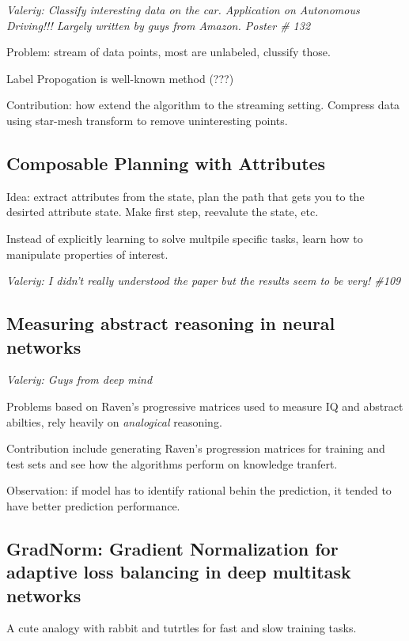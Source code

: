 \documentclass[11pt,oneside,a4paper]{scrartcl}
\newcommand{\valeriy}[1]{{\color{blue}\textit{Valeriy: #1}}}
\begin{document}
\valeriy{Classify interesting data on the car. Application on
  Autonomous Driving!!! Largely written by guys from Amazon. Poster \#
  132}

Problem: stream of data points, most are unlabeled, clussify those.

Label Propogation is well-known method (???)

Contribution: how extend the algorithm to the streaming
setting. Compress data using star-mesh transform to remove
uninteresting points.  

\subsection{Composable Planning with Attributes \cite{zhang18k}}
\label{sec:comp-plann-with}

Idea: extract attributes from the state, plan the path that gets you
to the desirted attribute state. Make first step, reevalute the state,
etc.

Instead of explicitly learning to solve multpile specific tasks, learn
how to manipulate properties of interest.

\valeriy{I didn't really understood the paper but the results seem to
  be very! \#109}

\subsection{Measuring abstract reasoning in neural networks
  \cite{santoro18a}}
\label{sec:meas-abstr-reas}

\valeriy{Guys from deep mind}

Problems based on Raven's progressive matrices used to measure IQ and
abstract abilties, rely heavily on \emph{analogical} reasoning.

Contribution include generating Raven's progression matrices for
training and test sets and see how the algorithms perform on knowledge
tranfert.

Observation: if model has to identify rational behin the prediction,
it tended to have better prediction performance.

\subsection{GradNorm: Gradient Normalization for adaptive loss
  balancing in deep multitask networks \cite{chen18a}}
\label{sec:gradn-grad-nrom}

A cute analogy with rabbit and tutrtles for fast and slow training
tasks.
\end{document}
